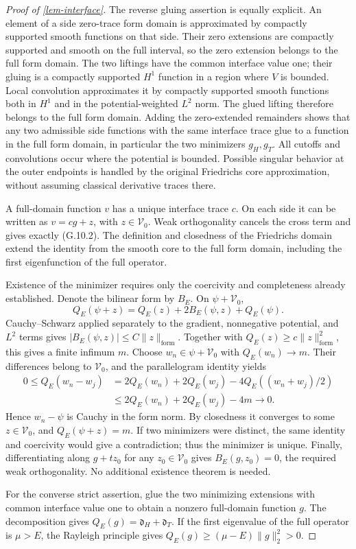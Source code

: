\documentclass[11pt,a4paper]{article}
\theoremstyle{proofmanuscript}
\begin{document}
\begin{proof}[Proof of \ref{lem-interface}]
The reverse gluing assertion is equally explicit. An element of a side zero-trace form domain is approximated by compactly supported smooth functions on that side. Their zero extensions are compactly supported and smooth on the full interval, so the zero extension belongs to the full form domain. The two liftings have the common interface value one; their gluing is a compactly supported \(H^1\) function in a region where \(V\) is bounded. Local convolution approximates it by compactly supported smooth functions both in \(H^1\) and in the potential-weighted \(L^2\) norm. The glued lifting therefore belongs to the full form domain. Adding the zero-extended remainders shows that any two admissible side functions with the same interface trace glue to a function in the full form domain, in particular the two minimizers \(g_H,g_T\). All cutoffs and convolutions occur where the potential is bounded. Possible singular behavior at the outer endpoints is handled by the original Friedrichs core approximation, without assuming classical derivative traces there.

A full-domain function \(v\) has a unique interface trace \(c\). On each side it can be written as \(v=cg+z\), with \(z\in\mathcal V_0\). Weak orthogonality cancels the cross term and gives exactly (G.10.2). The definition and closedness of the Friedrichs domain extend the identity from the smooth core to the full form domain, including the first eigenfunction of the full operator.

Existence of the minimizer requires only the coercivity and completeness already established. Denote the bilinear form by \(B_E\). On \(\psi+\mathcal V_0\), \[
Q_E(\psi+z)=Q_E(z)+2B_E(\psi,z)+Q_E(\psi).
\] Cauchy--Schwarz applied separately to the gradient, nonnegative potential, and \(L^2\) terms gives \(|B_E(\psi,z)|\le C\|z\|_{\mathrm{form}}\). Together with \(Q_E(z)\ge c\|z\|_{\mathrm{form}}^2\), this gives a finite infimum \(m\). Choose \(w_n\in\psi+\mathcal V_0\) with \(Q_E(w_n)\to m\). Their differences belong to \(\mathcal V_0\), and the parallelogram identity yields \[
\begin{aligned}
0\le Q_E(w_n-w_j)
&=2Q_E(w_n)+2Q_E(w_j)-4Q_E((w_n+w_j)/2)\\
&\le2Q_E(w_n)+2Q_E(w_j)-4m\longrightarrow0.
\end{aligned}
\] Hence \(w_n-\psi\) is Cauchy in the form norm. By closedness it converges to some \(z\in\mathcal V_0\), and \(Q_E(\psi+z)=m\). If two minimizers were distinct, the same identity and coercivity would give a contradiction; thus the minimizer is unique. Finally, differentiating along \(g+t z_0\) for any \(z_0\in\mathcal V_0\) gives \(B_E(g,z_0)=0\), the required weak orthogonality. No additional existence theorem is needed.

For the converse strict assertion, glue the two minimizing extensions with common interface value one to obtain a nonzero full-domain function \(g\). The decomposition gives \(Q_E(g)=\mathfrak d_H+\mathfrak d_T\). If the first eigenvalue of the full operator is \(\mu>E\), the Rayleigh principle gives \(Q_E(g)\ge(\mu-E)\|g\|_2^2>0\).

\end{proof}
\end{document}
